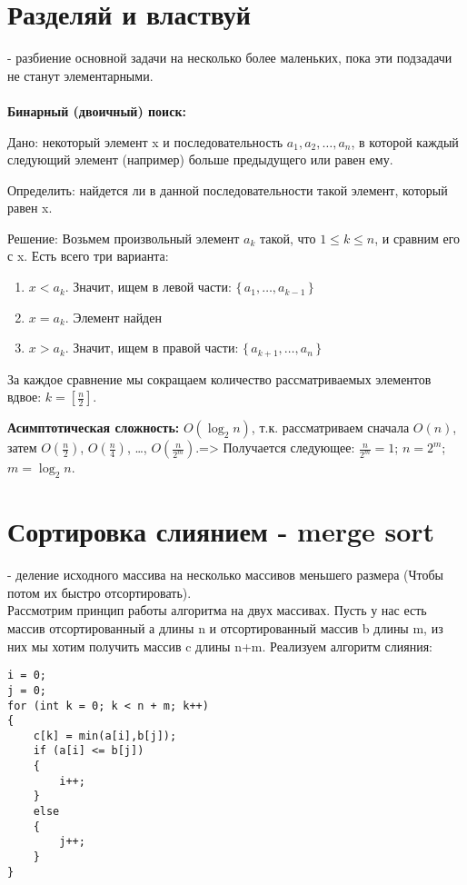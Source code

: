 \documentclass[a4paper,12pt]{article}
\begin{document}
\section {Разделяй и властвуй}
- разбиение основной задачи на несколько более маленьких, пока эти подзадачи не станут элементарными.\\ \\
\textbf{Бинарный (двоичный) поиск:} 

Дано: некоторый элемент x и последовательность $a_{1}, a_{2},\ldots, a_{n}$, в которой каждый следующий элемент (например) больше предыдущего или равен ему.

Определить: найдется ли в данной последовательности такой элемент, который равен x.

Решение: Возьмем произвольный элемент $a_{k}$ такой, что $1 \le k \le n$, и сравним его с x. Есть всего три варианта:

\begin{enumerate}
  \item $x < a_{k}$. Значит, ищем в левой части: $\{\,a_{1},\ldots,a_{k-1}\,\}$
  \item $x = a_{k}$. Элемент найден
  \item $x > a_{k}$. Значит, ищем в правой части: $\{\,a_{k+1},\ldots,a_{n}\,\}$
\end{enumerate}

За каждое сравнение мы сокращаем количество рассматриваемых элементов вдвое: $k = [\frac {n}{2}]$.

\textbf{Асимптотическая сложность:} $O(\log_{2}n)$, т.к. рассматриваем сначала $O(n)$, затем $O(\frac{n}{2})$, $O(\frac{n}{4})$, \ldots , $O(\frac{n}{2^{m}})$.=> Получается следующее: $\frac{n}{2^{m}}=1$; $n=2^{m}$; $m=\log_{2}n$.

\section {Сортировка слиянием - merge sort}

- деление исходного массива на несколько массивов меньшего размера (Чтобы потом их быстро отсортировать).\\ Рассмотрим принцип работы алгоритма на двух массивах. Пусть у нас есть массив отсортированный а длины n и отсортированный массив b длины m, из них мы хотим получить массив c длины n+m. Реализуем алгоритм слияния:
\lstset {language = C++, frame = single}
\begin{lstlisting}
i = 0;
j = 0;
for (int k = 0; k < n + m; k++)
{
    c[k] = min(a[i],b[j]); 
    if (a[i] <= b[j]) 
    {
        i++;
    }
    else
    {
        j++;
    }
}
\end{lstlisting}
\end{document}

